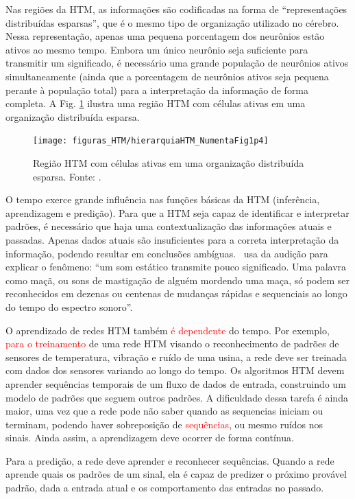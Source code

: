 Nas regiões da HTM, as informações são codificadas na forma de ``representações distribuídas esparsas'', que é o mesmo tipo de organização utilizado no cérebro. Nessa representação, apenas uma pequena porcentagem dos neurônios estão ativos ao mesmo tempo. Embora um único neurônio seja suficiente para transmitir um significado, é necessário uma grande população de neurônios ativos simultaneamente (ainda que a porcentagem de neurônios ativos seja pequena perante à população total) para a interpretação da informação de forma completa. A Fig. \ref{fig:hierarquiahtmnumentafig1p4} ilustra uma região HTM com células ativas em uma organização distribuída esparsa.

\begin{figure}[H]
	\centering
	\texttt{[image: figuras\_HTM/hierarquiaHTM\_NumentaFig1p4]}
	\caption{Região HTM com células ativas em uma organização distribuída esparsa. Fonte: \numenta.}
	\label{fig:hierarquiahtmnumentafig1p4}
\end{figure}

O tempo exerce grande influência nas funções básicas da HTM (inferência, aprendizagem e predição). Para que a HTM seja capaz de identificar e interpretar padrões, é necessário que haja uma contextualização das informações atuais e passadas. Apenas dados atuais são insuficientes para a correta interpretação da informação, podendo resultar em conclusões ambíguas. \numenta  \ usa da audição para explicar o fenômeno: ``um som estático transmite pouco significado. Uma palavra como maçã, ou sons de mastigação de alguém mordendo uma maça, só podem ser reconhecidos em dezenas ou centenas de mudanças rápidas e sequenciais ao longo do tempo do espectro sonoro''.

O aprendizado de redes HTM também \textcolor{red}{é dependente} do tempo. Por exemplo, \textcolor{red}{para o treinamento} de uma rede HTM visando o reconhecimento de padrões de sensores de temperatura, vibração e ruído de uma usina, a rede deve ser treinada com dados dos sensores variando ao longo do tempo. Os algoritmos HTM devem aprender sequências temporais de um fluxo de dados de entrada, construindo um modelo de padrões que seguem outros padrões. A dificuldade dessa tarefa é ainda maior, uma vez que a rede pode não saber quando as sequencias iniciam ou terminam, podendo haver sobreposição  de \textcolor{red}{sequências}, ou mesmo ruídos nos sinais. Ainda assim, a aprendizagem deve ocorrer de forma contínua.

Para a predição, a rede deve aprender e reconhecer sequências. Quando a rede aprende quais os padrões de um sinal, ela é capaz de predizer o próximo provável padrão, dada a entrada atual e os comportamento das entradas no passado.

